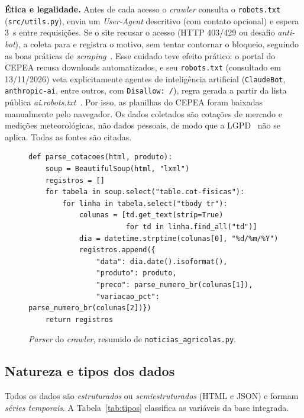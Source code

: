 \documentclass[conference]{IEEEtran}
\begin{document}
\textbf{Ética e legalidade.} Antes de cada acesso o \emph{crawler} consulta o \texttt{robots.txt}
(\texttt{src/utils.py}), envia um \emph{User-Agent} descritivo (com contato opcional) e espera 3~s entre
requisições. Se o site recusar o acesso (HTTP 403/429 ou desafio \emph{anti-bot}), a coleta para e registra o
motivo, sem tentar contornar o bloqueio, seguindo as boas práticas de \emph{scraping}~\cite{mitchell}. Esse cuidado teve efeito prático: o portal do CEPEA recusa
downloads automatizados, e seu \texttt{robots.txt} (consultado em 13/11/2026) veta explicitamente
agentes de inteligência artificial (\texttt{ClaudeBot}, \texttt{anthropic-ai}, entre outros, com
\texttt{Disallow: /}), regra gerada a partir da lista pública \emph{ai.robots.txt}~\cite{airobots}. Por isso, as planilhas do CEPEA foram baixadas manualmente pelo navegador. Os dados coletados são cotações de mercado e medições meteorológicas, não dados
pessoais, de modo que a LGPD~\cite{lgpd} não se aplica. Todas as fontes são citadas.

\begin{figure}[!tb]
\begin{lstlisting}
def parse_cotacoes(html, produto):
    soup = BeautifulSoup(html, "lxml")
    registros = []
    for tabela in soup.select("table.cot-fisicas"):
        for linha in tabela.select("tbody tr"):
            colunas = [td.get_text(strip=True)
                       for td in linha.find_all("td")]
            dia = datetime.strptime(colunas[0], "%d/%m/%Y")
            registros.append({
                "data": dia.date().isoformat(),
                "produto": produto,
                "preco": parse_numero_br(colunas[1]),
                "variacao_pct": parse_numero_br(colunas[2])})
    return registros
\end{lstlisting}
\caption{\emph{Parser} do \emph{crawler}, resumido de \texttt{noticias\_agricolas.py}.}
\label{lst:crawler}
\end{figure}

\subsection{Natureza e tipos dos dados}

Todos os dados são \emph{estruturados} ou \emph{semiestruturados} (HTML e JSON) e formam
\emph{séries temporais}. A Tabela~\ref{tab:tipos} classifica as variáveis da base integrada.
\end{document}
